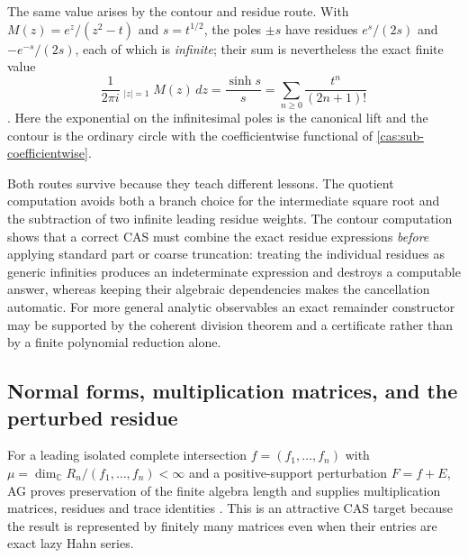 \documentclass[11pt,letterpaper]{article}
\numberwithin{equation}{section}
\theoremstyle{definition}
\theoremstyle{remark}
\newcommand{\C}{\mathbb C}
\newcommand{\HInt}{\mathop{\int^{\!H}}\nolimits}
\begin{document}
The same value arises by the contour and residue route. With
$M(z)=e^z/(z^2-t)$ and $s=t^{1/2}$, the poles $\pm s$ have residues $e^s/(2s)$
and $-e^{-s}/(2s)$, each of which is \emph{infinite}; their sum is nevertheless
the exact finite value
\begin{equation}\label{cas:eq-residue}
 \frac1{2\pi i}\HInt_{|z|=1}M(z)\,dz=\frac{\sinh s}{s}
 =\sum_{n\ge0}\frac{t^n}{(2n+1)!}
\end{equation}
\cite{cas:SourceAnalysisTwo,cas:SourceAnalysisThree}. Here the exponential on
the infinitesimal poles is the canonical lift and the contour is the ordinary
circle with the coefficientwise functional of \cref{cas:sub-coefficientwise}.

Both routes survive because they teach different lessons. The quotient
computation avoids both a branch choice for the intermediate square root and the
subtraction of two infinite leading residue weights. The contour computation
shows that a correct CAS must combine the exact residue expressions
\emph{before} applying standard part or coarse truncation: treating the
individual residues as generic infinities produces an indeterminate expression
and destroys a computable answer, whereas keeping their algebraic dependencies
makes the cancellation automatic. For more general analytic observables an exact
remainder constructor may be supported by the coherent division theorem and a
certificate rather than by a finite polynomial reduction alone.

\subsection{Normal forms, multiplication matrices, and the perturbed residue}
\label{cas:sub-normalforms}
For a leading isolated complete intersection $f=(f_1,\dots,f_n)$ with
$\mu=\dim_\C R_n/(f_1,\dots,f_n)<\infty$ and a positive-support perturbation
$F=f+E$, AG proves preservation of the finite algebra length and supplies
multiplication matrices, residues and trace identities \cite{cas:SourceAG}. This
is an attractive CAS target because the result is represented by finitely many
matrices even when their entries are exact lazy Hahn series.
\end{document}
